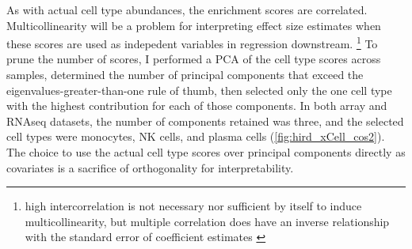 As with actual cell type abundances, the enrichment scores are correlated.
Multicollinearity will be a problem for interpreting effect size estimates when these scores are used as indepedent variables in regression downstream.
\footnote{high intercorrelation is not necessary nor sufficient by itself to induce multicollinearity, but multiple correlation does have an inverse relationship with the standard error of coefficient estimates \autocite{maddala1992IntroductionEconometrics}}
To prune the number of scores, I performed a \gls{PCA} of the cell type scores across samples,
determined the number of principal components that exceed the eigenvalues-greater-than-one rule of thumb\autocite{kanyongo2005InfluenceReliabilityFour},
then selected only the one cell type with the highest contribution for each of those components.
In both array and \gls{RNAseq} datasets, the number of components retained was three, and the selected cell types were monocytes, \gls{NK} cells, and plasma cells (\cref{fig:hird_xCell_cos2}).
The choice to use the actual cell type scores over principal components directly as covariates is a sacrifice of orthogonality for interpretability.

